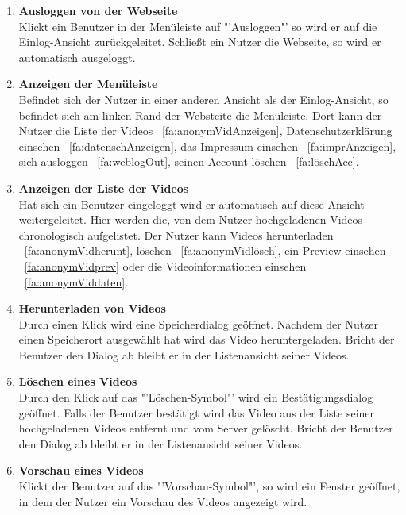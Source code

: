 \begin{enumerate}
\item \label{fa:weblogOut}\textbf{Ausloggen von der Webseite} \hfill \\
Klickt ein Benutzer in der Menüleiste auf "'Ausloggen"' so wird er auf die Einlog-Ansicht zurückgeleitet. Schließt ein Nutzer die Webseite, so wird er automatisch ausgeloggt.

\item \textbf{Anzeigen der Menüleiste} \hfill \\
Befindet sich der Nutzer in einer anderen Ansicht als der Einlog-Ansicht, so befindet sich am linken Rand der Websteite die Menüleiste. Dort kann der Nutzer die Liste der  Videos ~\eqref{fa:anonymVidAnzeigen}, Datenschutzerklärung einsehen ~\eqref{fa:datenschAnzeigen}, das Impressum einsehen ~\eqref{fa:imprAnzeigen}, sich ausloggen ~\eqref{fa:weblogOut}, seinen Account löschen ~\eqref{fa:löschAcc}.

\item \label{fa:anonymVidAnzeigen}\textbf{Anzeigen der Liste der  Videos} \hfill \\
Hat sich ein Benutzer eingeloggt wird er automatisch auf diese Ansicht weitergeleitet. Hier werden die, von dem Nutzer hochgeladenen Videos chronologisch aufgelistet. Der Nutzer kann Videos herunterladen ~\eqref{fa:anonymVidherunt}, löschen ~\eqref{fa:anonymVidlösch}, ein Preview einsehen ~\eqref{fa:anonymVidprev} oder die Videoinformationen einsehen ~\eqref{fa:anonymViddaten}.

\item \label{fa:anonymVidherunt}\textbf{Herunterladen von  Videos} \hfill \\
Durch einen Klick wird eine Speicherdialog geöffnet. Nachdem der Nutzer einen Speicherort ausgewählt hat wird das Video heruntergeladen. Bricht der Benutzer den Dialog ab bleibt er in der Listenansicht seiner Videos.

\item \label{fa:anonymVidlösch}\textbf{Löschen eines  Videos} \hfill \\
Durch den Klick auf das "'Löschen-Symbol"' wird ein Bestätigungsdialog geöffnet. Falls der Benutzer bestätigt wird das Video aus der Liste seiner hochgeladenen Videos entfernt und vom Server gelöscht. Bricht der Benutzer den Dialog ab bleibt er in der Listenansicht seiner Videos.

\item \label{fa:anonymVidprev}\textbf{Vorschau eines  Videos} \hfill \\
Klickt der Benutzer auf das "'Vorschau-Symbol"', so wird ein Fenster geöffnet, in dem der Nutzer ein Vorschau des  Videos angezeigt wird.


\end{enumerate}

